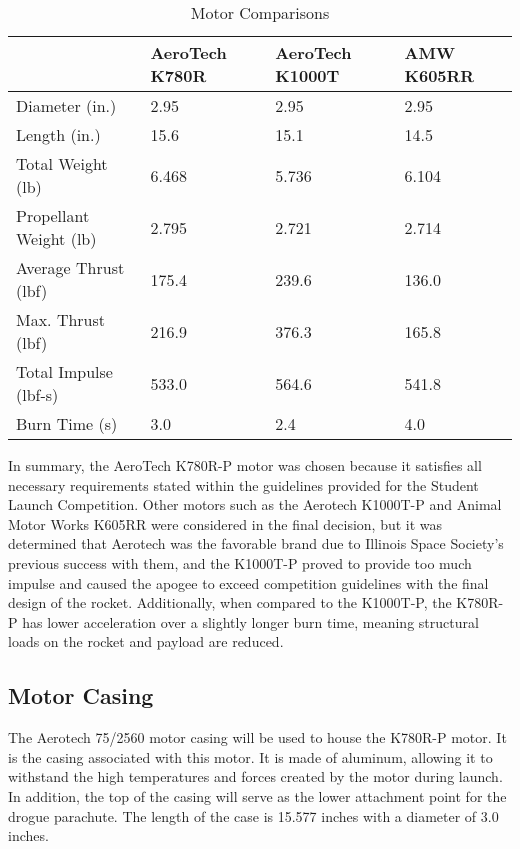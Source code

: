 \begin{table}[]
    {\footnotesize
    \caption{Motor Comparisons}
    \centering
    \begin{tabularx}{\linewidth}{XXX}
    \toprule
     & AeroTech K780R & AeroTech K1000T & AMW K605RR \\ \midrule
    Diameter (in.) & 2.95 & 2.95 & 2.95 \\
    Length (in.) & 15.6 & 15.1 & 14.5 \\
    Total Weight (lb) & 6.468 & 5.736 & 6.104 \\
    Propellant Weight (lb) & 2.795 & 2.721 & 2.714 \\
    Average Thrust (lbf) & 175.4 & 239.6 & 136.0 \\
    Max. Thrust (lbf) & 216.9 & 376.3 & 165.8 \\
    Total Impulse (lbf-s) & 533.0 & 564.6 & 541.8 \\
    Burn Time (s) & 3.0 & 2.4 & 4.0 \\
    \bottomrule
    \end{tabularx}
    }
\end{table}

In summary, the AeroTech K780R-P motor was chosen because it satisfies all necessary requirements stated within the guidelines provided for the Student Launch Competition. Other motors such as the Aerotech K1000T-P and Animal Motor Works K605RR were considered in the final decision, but it was determined that Aerotech was the favorable brand due to Illinois Space Society’s previous success with them, and the K1000T-P proved to provide too much impulse and caused the apogee to exceed competition guidelines with the final design of the rocket. Additionally, when compared to the K1000T-P, the K780R-P has lower acceleration over a slightly longer burn time, meaning structural loads on the rocket and payload are reduced.

    \subsection{Motor Casing}
The Aerotech 75/2560 motor casing will be used to house the K780R-P motor. It is the casing associated with this motor. It is made of aluminum, allowing it to withstand the high temperatures and forces created by the motor during launch. In addition, the top of the casing will serve as the lower attachment point for the drogue parachute. The length of the case is 15.577 inches with a diameter of 3.0 inches.


